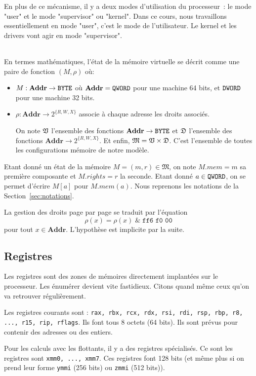 \documentclass{book}
\newenvironment{formalisme}[1]{%
	\def\FrameCommand{\fboxrule=\FrameRule\fboxsep=\FrameSep \fcolorbox{red!10}{red!5}}%
	\MakeFramed {\advance\hsize-\width \FrameRestore}
	\noindent {\bf #1}\\
}%
{\endMakeFramed}
\newcommand{\code}[1]{\texttt{#1}}
\newcommand{\BYTE}{{\tt BYTE}}
\newcommand{\DWORD}{{\tt DWORD}}
\newcommand{\QWORD}{{\tt QWORD}}
\newcommand{\Memory}{{\mathfrak{M}}}
\newcommand{\Addr}{{\mathbf{Addr}}}
\begin{document}
\medskip
En plus de ce mécanisme, il y a deux modes d'utilisation du processeur~: le mode "user" et le mode "supervisor" ou "kernel". Dans ce cours, nous travaillons essentiellement en mode "user", c'est le mode de l'utilisateur. Le kernel et les drivers vont agir en mode "supervisor". 

\begin{formalisme}{La mémoire virtuelle}
En termes mathématiques, l'état de la mémoire virtuelle se décrit comme une paire de fonction $(M,\rho)$ où:
\begin{itemize}
	\item $M : \Addr \to \BYTE$ où $\Addr = \QWORD$ pour une machine 64 bits, et $\DWORD$ pour une machine 32 bits.
	\item $\rho: \Addr \to 2^{\{R, W, X\}}$ associe à chaque adresse les droits associés.
	
On note $\frak{V}$ l'ensemble des fonctions $\Addr \to \BYTE$ et $\frak{D}$ l'ensemble des fonctions $\Addr \to 2^{\{R, W, X\}}$. Et enfin, $\Memory = \frak{V} \times \frak{D}$. C'est l'ensemble de toutes les configurations mémoire de notre modèle. 
\end{itemize}

Etant donné un état de la mémoire $M = (m,r) \in \Memory$, on note $M.mem = m$ sa première composante et $M.rights = r$ la seconde. Etant donné $a \in \QWORD$, on se permet d'écrire $M[a]$ pour $M.mem(a)$. Nous reprenons les notations de la Section~\ref{sec:notations}.

La gestion des droits page par page se traduit par l'équation $$\rho(x) = \rho(x)\; \& \; \code{ff\^{}6 f0 00}$$ pour tout $x\in \Addr$. L'hypothèse est implicite par la suite. 	
\end{formalisme}

\subsection{Registres}
Les registres sont des zones de mémoires directement implantées sur le processeur. Les énumérer devient vite fastidieux. Citons quand même ceux qu'on va retrouver régulièrement. 

Les registres courants sont : {\tt rax, rbx, rcx, rdx, rsi, rdi, rsp, rbp, r8, ..., r15, rip, rflags}. Ils font tous 8 octets (64 bits). Ils sont prévus pour contenir des adresses ou des entiers.

Pour les calculs avec les flottants, il y a des registres spécialisés. Ce sont les registres sont {\tt xmm0, ..., xmm7}. Ces registres font 128 bits (et même plus si on prend leur forme {\tt ymmi} (256 bits) ou {\tt zmmi} (512 bits)). 
\end{document}
